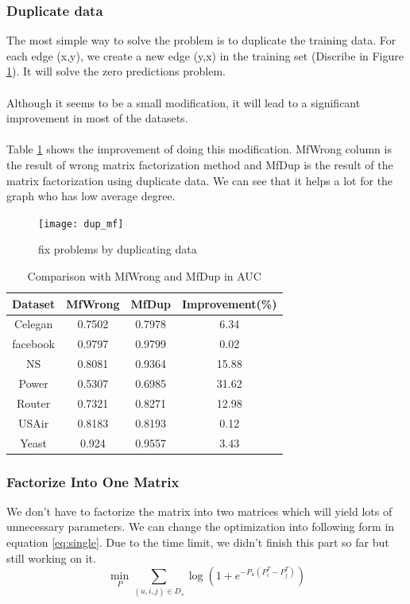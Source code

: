 \documentclass[12pt]{article}
\begin{document}
\subsubsection{Duplicate data}
The most simple way to solve the problem is to duplicate the training data. For each edge (x,y), we create a new edge (y,x) in the training set (Discribe in Figure \ref{fig:dup_mf}). It will solve the zero predictions problem. 
\\ \\
Although it seems to be a small modification, it will lead to a significant improvement in most of the datasets.
\\ \\
Table \ref{tab:dup} shows the improvement of doing this modification. MfWrong column is the result of wrong matrix factorization method and MfDup is the result of the matrix factorization using duplicate data. We can see that it helps a lot for the graph who has low average degree. 


\begin{figure}[h]
	\centering
	\texttt{[image: dup\_mf]}
	\caption{fix problems by duplicating data}
	\label{fig:dup_mf}
\end{figure}

\begin{table}
	\begin{center}
		\begin{tabular}{|c|c|c|c|}
			\hline
			Dataset & MfWrong & MfDup & Improvement(\%) \\
			\hline
			Celegan&0.7502&0.7978&6.34\\
			facebook&0.9797&0.9799&0.02\\
			NS&0.8081&0.9364&15.88\\
			Power&0.5307&0.6985&31.62\\
			Router&0.7321&0.8271&12.98\\
			USAir&0.8183&0.8193&0.12\\
			Yeast&0.924&0.9557&3.43\\
			\hline
		\end{tabular}
	\end{center}
	\caption{Comparison with MfWrong and MfDup in AUC}
	\label{tab:dup}
\end{table}

\subsubsection{Factorize Into One Matrix}
We don't have to factorize the matrix into two matrices which will yield lots of unnecessary parameters. We can change the optimization into following form in equation \ref{eq:single}. Due to the time limit, we didn't finish this part so far but still working on it.
\begin{equation}
\min_{P} \sum_{(u,i,j)\in D_s}\log(1+e^{-P_u(P_i^T - P_j^T)})
\label{eq:single}
\end{equation}
\end{document}
